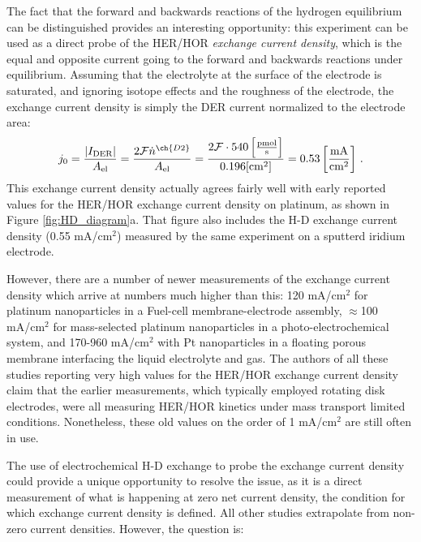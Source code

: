 The fact that the forward and backwards reactions of the hydrogen equilibrium can be distinguished provides an interesting opportunity: this experiment can be used as a direct probe of the HER/HOR \textit{exchange current density}, which is the equal and opposite current going to the forward and backwards reactions under equilibrium. Assuming that the electrolyte at the surface of the electrode is  saturated, and ignoring isotope effects and the roughness of the electrode, the exchange current density is simply the DER current normalized to the electrode area:
\begin{equation}
j_0 = \frac{|I_\text{DER}|}{A_\text{el}} = \frac{2\mathcal{F}\dot{n}^{\ch{D2}}}{A_\text{el}} = \frac{2\mathcal{F}\cdot 540 \left[\frac{\text{pmol}}{\text{s}}\right]}{0.196 [\text{cm}^2]} = 0.53 \left[\frac{\text{mA}}{\text{cm}^2}\right]\,.
\end{equation} 
This exchange current density actually agrees fairly well with early reported values for the HER/HOR exchange current density on platinum\cite{Trasatti1972c, Nørskov2005a}, as shown in Figure \ref{fig:HD_diagram}a. That figure also includes the H-D exchange current density (0.55 mA/cm$^2$) measured by the same experiment on a sputterd iridium electrode.

However, there are a number of newer measurements of the exchange current density which arrive at numbers much higher than this: 120 mA/cm$^2$ for platinum nanoparticles in a Fuel-cell membrane-electrode assembly\cite{Durst2015}, $\approx$100 mA/cm$^2$ for mass-selected platinum nanoparticles in a photo-electrochemical system\cite{Kemppainen2015}, and 170-960 mA/cm$^2$ with Pt nanoparticles in a floating porous membrane interfacing the liquid electrolyte and  gas\cite{Zalitis2017b}. The authors of all these studies reporting very high values for the HER/HOR exchange current density claim that the earlier measurements, which typically employed rotating disk electrodes, were all measuring HER/HOR kinetics under mass transport limited conditions. Nonetheless, these old values on the order of 1 mA/cm$^2$ are still often in use\cite{Tymoczko2016}.

The use of electrochemical H-D exchange to probe the exchange current density could provide a unique opportunity to resolve the issue, as it is a direct measurement of what is happening at zero net current density, the condition for which exchange current density is defined. All other studies extrapolate from non-zero current densities. However, the question is: 

